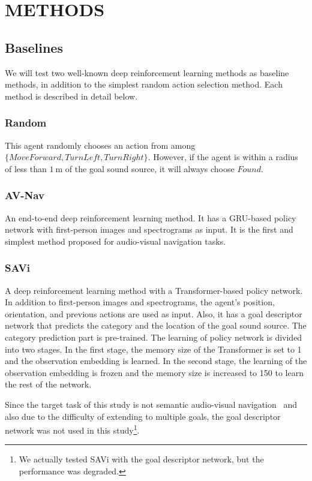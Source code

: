 \section{METHODS}


\subsection{Baselines}

We will test two well-known deep reinforcement learning methods as baseline methods, in addition to the simplest random action selection method.
Each method is described in detail below.

\subsubsection{Random}
This agent randomly chooses an action from among $\{MoveForward, TurnLeft, TurnRight\}$.
However, if the agent is within a radius of less than $1\ \mathrm{m}$ of the goal sound source, it will always choose $Found$.

\subsubsection{AV-Nav \cite{chen2020soundspaces}}
An end-to-end deep reinforcement learning method.
It has a GRU-based policy network with first-person images and spectrograms as input.
It is the first and simplest method proposed for audio-visual navigation tasks.

\subsubsection{SAVi \cite{chen2021semantic}}
A deep reinforcement learning method with a Transformer-based policy network.
In addition to first-person images and spectrograms, the agent's position, orientation, and previous actions are used as input.
Also, it has a goal descriptor network that predicts the category and the location of the goal sound source. The category prediction part is pre-trained.
The learning of policy network is divided into two stages.
In the first stage, the memory size of the Transformer is set to 1 and the observation embedding is learned.
In the second stage, the learning of the observation embedding is frozen and the memory size is increased to 150 to learn the rest of the network.

Since the target task of this study is not semantic audio-visual navigation~\cite{chen2021semantic} and also due to the difficulty of extending to multiple goals, the goal descriptor network was not used in this study\footnote{We actually tested SAVi with the goal descriptor network, but the performance was degraded.}.


